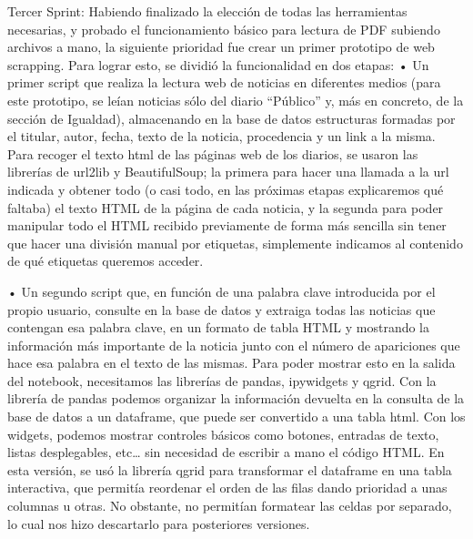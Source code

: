 Tercer Sprint:
Habiendo finalizado la elección de todas las herramientas necesarias, y probado el funcionamiento básico para lectura de PDF subiendo archivos a mano, la siguiente prioridad fue crear un primer prototipo de web scrapping.
Para lograr esto, se dividió la funcionalidad en dos etapas:
•	Un primer script que realiza la lectura web de noticias en diferentes medios (para este prototipo, se leían noticias sólo del diario “Público” y, más en concreto, de la sección de Igualdad), almacenando en la base de datos estructuras formadas por el titular, autor, fecha, texto de la noticia, procedencia y un link a la misma.
Para recoger el texto html de las páginas web de los diarios, se usaron las librerías de url2lib y BeautifulSoup; la primera para hacer una llamada a la url indicada y obtener todo (o casi todo, en las próximas etapas explicaremos qué faltaba) el texto HTML de la página de cada noticia, y la segunda para poder manipular todo el HTML recibido previamente de forma más sencilla sin tener que hacer una división manual por etiquetas, simplemente indicamos al contenido de qué etiquetas queremos acceder.
 
•	Un segundo script que, en función de una palabra clave introducida por el propio usuario, consulte en la base de datos y extraiga todas las noticias que contengan esa palabra clave, en un formato de tabla HTML y mostrando la información más importante de la noticia junto con el número de apariciones que hace esa palabra en el texto de las mismas.
Para poder mostrar esto en la salida del notebook, necesitamos las librerías de pandas, ipywidgets y qgrid. Con la librería de pandas podemos organizar la información devuelta en la consulta de la base de datos a un dataframe, que puede ser convertido a una tabla html. Con los widgets, podemos mostrar controles básicos como botones, entradas de texto, listas desplegables, etc… sin necesidad de escribir a mano el código HTML. En esta versión, se usó la librería qgrid para transformar el dataframe en una tabla interactiva, que permitía reordenar el orden de las filas dando prioridad a unas columnas u otras. No obstante, no permitían formatear las celdas por separado, lo cual nos hizo descartarlo para posteriores versiones.

